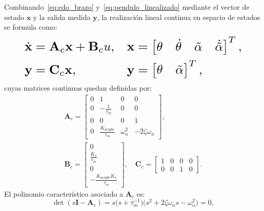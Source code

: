 Combinando~\eqref{eq:edo_brazo} y~\eqref{eq:pendulo_linealizado} mediante el vector de estado $\mathbf{x}$ y la salida medida $\mathbf{y}$, la realización lineal continua en espacio de estados se formula como:
\begin{equation}
\resizebox{0.88\columnwidth}{!}{$\displaystyle
    \begin{aligned}
        \dot{\mathbf{x}} &= \mathbf{A}_c\mathbf{x} + \mathbf{B}_c u, &
        \mathbf{x} &= \begin{bmatrix} \theta & \dot{\theta} & \tilde{\alpha} & \dot{\tilde{\alpha}} \end{bmatrix}^T, \\
        \mathbf{y} &= \mathbf{C}_c\mathbf{x}, &
        \mathbf{y} &= \begin{bmatrix} \theta & \tilde{\alpha} \end{bmatrix}^T,
    \end{aligned}
$}
    \label{eq:ss_continuo}
\end{equation}
cuyas matrices continuas quedan definidas por:
\begin{gather}
    \mathbf{A}_c = \begin{bmatrix}
        0 & 1 & 0 & 0 \\
        0 & -\frac{1}{\tau_m} & 0 & 0 \\
        0 & 0 & 0 & 1 \\
        0 & \frac{K_{\text{acople}}}{\tau_m} & \omega_n^2 & -2\zeta\omega_n
    \end{bmatrix}, \label{eq:matriz_ac} \\
    \mathbf{B}_c = \begin{bmatrix}
        0 \\
        \frac{K_v}{\tau_m} \\
        0 \\
        -\frac{K_{\text{acople}}K_v}{\tau_m}
    \end{bmatrix}, \quad
    \mathbf{C}_c = \begin{bmatrix}
        1 & 0 & 0 & 0 \\
        0 & 0 & 1 & 0
    \end{bmatrix}. \label{eq:matrices_bc_cc}
\end{gather}
El polinomio característico asociado a $\mathbf{A}_c$ es:
\begin{equation}
    \det(s\mathbf{I} - \mathbf{A}_c) = s\bigl(s + \tau_m^{-1}\bigr)\bigl(s^2 + 2\zeta\omega_n s - \omega_n^2\bigr) = 0,
    \label{eq:pol_caracteristico}
\end{equation}
